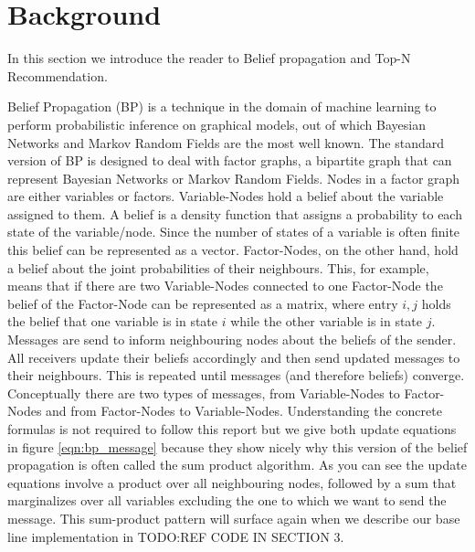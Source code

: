 \section{Background}\label{sec:background}

In this section we introduce the reader to Belief propagation and Top-N Recommendation.

Belief Propagation (BP) is a technique in the domain of machine learning to perform probabilistic inference on graphical models, out of which Bayesian Networks and Markov Random Fields are the most well known. The standard version of BP is designed to deal with factor graphs, a bipartite graph that can represent Bayesian Networks or Markov Random Fields. Nodes in a factor graph are either variables or factors. Variable-Nodes hold a belief about the variable assigned to them. A belief is a density function that assigns a probability to each state of the variable/node. Since the number of states of a variable is often finite this belief can be represented as a vector. Factor-Nodes, on the other hand, hold a belief about the joint probabilities of their neighbours. This, for example, means that if there are two Variable-Nodes connected to one Factor-Node the belief of the Factor-Node can be represented as a matrix, where entry $i,j$ holds the belief that one variable is in state $i$ while the other variable is in state $j$. Messages are send to inform neighbouring nodes about the beliefs of the sender. All receivers update their beliefs accordingly and then send updated messages to their neighbours. This is repeated until messages (and therefore beliefs) converge. Conceptually there are two types of messages, from Variable-Nodes to Factor-Nodes and from Factor-Nodes to Variable-Nodes. Understanding the concrete formulas is not required to follow this report but we give both update equations in figure \ref{eqn:bp_message} because they show nicely why this version of the belief propagation is often called the sum product algorithm. As you can see the update equations involve a product over all neighbouring nodes, followed by a sum that marginalizes over all variables excluding the one to which we want to send the message. This sum-product pattern will surface again when we describe our base line implementation in TODO:REF CODE IN SECTION 3.

